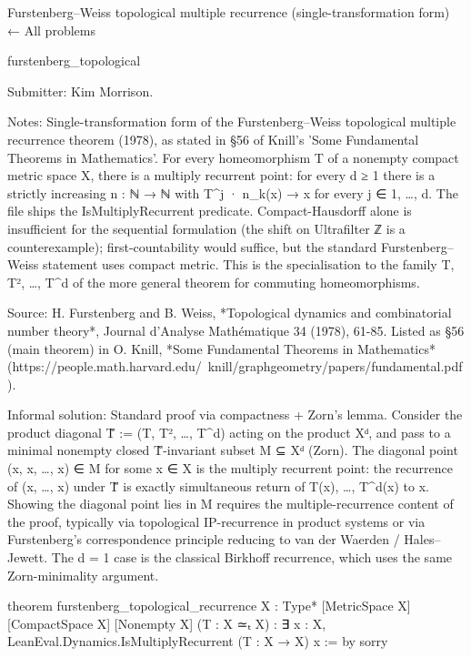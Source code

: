 Furstenberg–Weiss topological multiple recurrence (single-transformation form)
← All problems

furstenberg_topological

Submitter: Kim Morrison.

Notes: Single-transformation form of the Furstenberg–Weiss topological multiple recurrence theorem (1978), as stated in §56 of Knill's 'Some Fundamental Theorems in Mathematics'. For every homeomorphism T of a nonempty compact metric space X, there is a multiply recurrent point: for every d ≥ 1 there is a strictly increasing n : ℕ → ℕ with T^{j · n_k}(x) → x for every j ∈ {1, …, d}. The file ships the IsMultiplyRecurrent predicate. Compact-Hausdorff alone is insufficient for the sequential formulation (the shift on Ultrafilter ℤ is a counterexample); first-countability would suffice, but the standard Furstenberg–Weiss statement uses compact metric. This is the specialisation to the family T, T², …, T^d of the more general theorem for commuting homeomorphisms.

Source: H. Furstenberg and B. Weiss, *Topological dynamics and combinatorial number theory*, Journal d'Analyse Mathématique 34 (1978), 61-85. Listed as §56 (main theorem) in O. Knill, *Some Fundamental Theorems in Mathematics* (https://people.math.harvard.edu/~knill/graphgeometry/papers/fundamental.pdf).

Informal solution: Standard proof via compactness + Zorn's lemma. Consider the product diagonal T̃ := (T, T², …, T^d) acting on the product Xᵈ, and pass to a minimal nonempty closed T̃-invariant subset M ⊆ Xᵈ (Zorn). The diagonal point (x, x, …, x) ∈ M for some x ∈ X is the multiply recurrent point: the recurrence of (x, …, x) under T̃ is exactly simultaneous return of T(x), …, T^d(x) to x. Showing the diagonal point lies in M requires the multiple-recurrence content of the proof, typically via topological IP-recurrence in product systems or via Furstenberg's correspondence principle reducing to van der Waerden / Hales–Jewett. The d = 1 case is the classical Birkhoff recurrence, which uses the same Zorn-minimality argument.

theorem furstenberg_topological_recurrence {X : Type*} [MetricSpace X]
    [CompactSpace X] [Nonempty X] (T : X ≃ₜ X) :
    ∃ x : X, LeanEval.Dynamics.IsMultiplyRecurrent (T : X → X) x := by
  sorry
